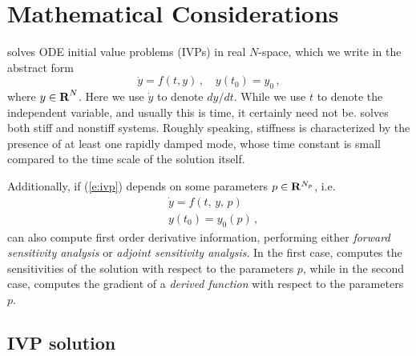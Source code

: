 \chapter{Mathematical Considerations}\label{s:math}

{\cvodes} solves ODE initial value problems (IVPs) in real $N$-space, which we
write in the abstract form
\begin{equation}\label{e:ivp}
  \dot{y} = f(t,y) \, ,\quad y(t_0) = y_0 \, ,
\end{equation}
where $y \in \mbox{\bf R}^N$.
Here we use $\dot{y}$ to denote $dy/dt$.  While we use $t$ to denote
the independent variable, and usually this is time, it certainly need
not be.  {\cvodes} solves both stiff and nonstiff systems.  Roughly
speaking, stiffness is characterized by the presence of at least one
rapidly damped mode, whose time constant is small compared to the time
scale of the solution itself.

Additionally, if (\ref{e:ivp}) depends on some parameters $p \in {\bf R}^{N_p}$,
i.e.
\begin{equation}\label{e:ivp_p}
\begin{split}
&{\dot{y}}  = f(t,\,y,\,p) \\
&y(t_0)  = y_0(p) \, ,
\end{split}
\end{equation}
{\cvodes} can also compute first order derivative information, performing either
{\em forward sensitivity analysis} or {\em adjoint sensitivity analysis}.
In the first case, {\cvodes} computes the sensitivities of the
solution with respect to the parameters $p$, while in the second case,
{\cvodes} computes the gradient of a {\em derived function} with
respect to the parameters $p$.

\section{IVP solution}\label{ss:ivp_sol}


